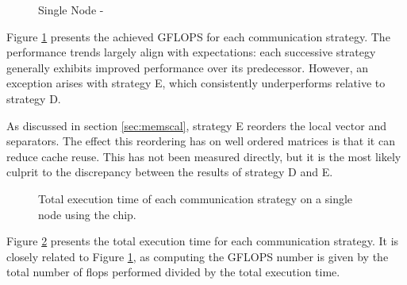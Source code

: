 \begin{figure}[H]
    \centering
    \caption{Single Node - }
    \label{fig:gflopsdefqsingle}
\end{figure}
Figure \ref{fig:gflopsdefqsingle} presents the achieved GFLOPS for each communication strategy. The performance trends largely align with expectations: each successive strategy generally exhibits improved performance over its predecessor. However, an exception arises with strategy E, which consistently underperforms relative to strategy D.
\medskip

As discussed in section \ref{sec:memscal}, strategy E reorders the local vector and separators. The effect this reordering has on well ordered matrices is that it can reduce cache reuse. This has not been measured directly, but it is the most likely culprit to the discrepancy between the results of strategy D and E.

 
\begin{figure}[H]
    \centering
    \caption{Total execution time of each communication strategy on a single node using the  chip.}
    \label{fig:tdefqsingle}
\end{figure}

Figure \ref{fig:tdefqsingle} presents the total execution time for each communication strategy. It is closely related to Figure \ref{fig:gflopsdefqsingle}, as computing the GFLOPS number is given by the total number of flops performed divided by the total execution time.


